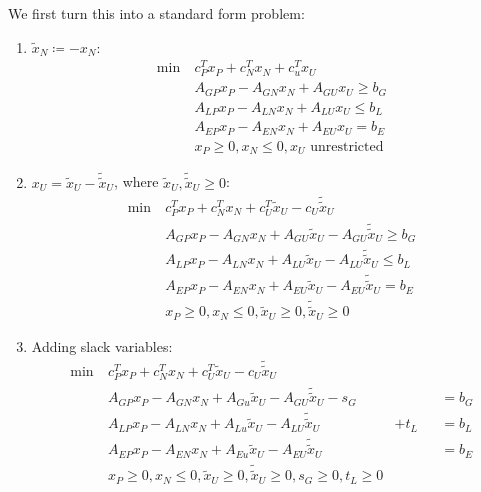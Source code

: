 We first turn this into a standard form problem:
\begin{enumerate}
	\item \(\widetilde{x}_N \coloneqq -x_N\):
	      \begin{align*}
		      \min~ & c^{T}_P x_P + c^{T}_N x_N + c^{T}_u x_U         \\
		            & A_{GP}x_P -A_{GN}x_N + A_{GU}x_U\geq b_G        \\
		            & A_{LP}x_P -A_{LN}x_N + A_{LU}x_U \leq b_L       \\
		            & A_{EP}x_P -A_{EN}x_N + A_{EU}x_U = b_E          \\
		            & x_P\geq 0, x_N \leq 0, x_U \text{ unrestricted}
	      \end{align*}
	\item \(x_U = \widetilde{x}_U - \widetilde{\widetilde{x}}_U\), where \(\widetilde{x}_U, \widetilde{\widetilde{x}}_U \geq 0\):
	      \begin{align*}
		      \min~ & c^{T}_P x_P + c^{T}_N x_N + c^{T}_U \widetilde{x}_U - c_U \widetilde{\widetilde{x}}_U    \\
		            & A_{GP}x_P -A_{GN}x_N + A_{GU}\widetilde{x}_U -A_{GU}\widetilde{\widetilde{x}}_U \geq b_G \\
		            & A_{LP}x_P -A_{LN}x_N + A_{LU}\widetilde{x}_U -A_{LU}\widetilde{\widetilde{x}}_U\leq b_L  \\
		            & A_{EP}x_P -A_{EN}x_N + A_{EU}\widetilde{x}_U -A_{EU}\widetilde{\widetilde{x}}_U= b_E     \\
		            & x_P\geq 0, x_N \leq 0, \widetilde{x}_U \geq 0, \widetilde{\widetilde{x}}_U\geq 0
	      \end{align*}
	\item Adding slack variables:
	      \[
		      \begin{alignedat}{3}
			      \min~ & c^{T}_P x_P + c^{T}_N x_N + c^{T}_U \widetilde{x}_U - c_U \widetilde{\widetilde{x}}_U    \\
			      & A_{GP}x_P -A_{GN}x_N + A_{Gu}\widetilde{x}_U -A_{GU}\widetilde{\widetilde{x}}_U - s_G &       && = b_G \\
			      & A_{LP}x_P -A_{LN}x_N + A_{Lu}\widetilde{x}_U -A_{LU}\widetilde{\widetilde{x}}_U       & + t_L && = b_L \\
			      & A_{EP}x_P -A_{EN}x_N + A_{Eu}\widetilde{x}_U -A_{EU}\widetilde{\widetilde{x}}_U       &       && = b_E \\
			      & x_P\geq 0, x_N \leq 0, \widetilde{x}_U \geq 0, \widetilde{\widetilde{x}}_U\geq 0, s_G\geq 0, t_L \geq 0
		      \end{alignedat}
	      \]
\end{enumerate}

